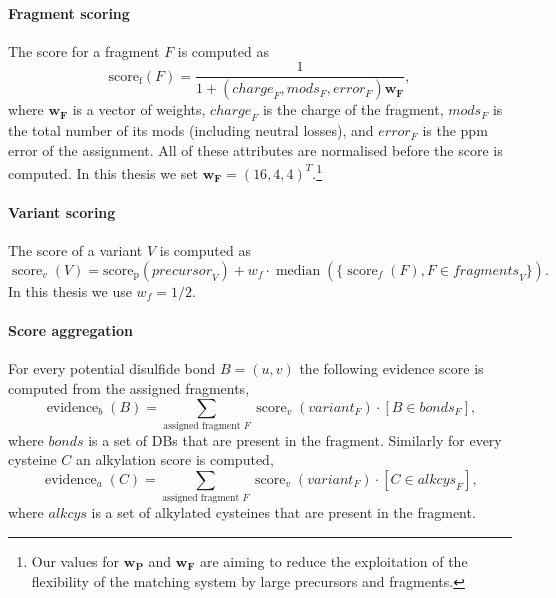 \paragraph{Fragment scoring} The score for a fragment \(F\) is computed as \[\operatorname{score_f}(F) = \frac{1}{1 + (\mathit{charge}_F, \mathit{mods}_F, \mathit{error}_F)\bm{w_F}},\] where \(\bm{w_F}\) is a vector of weights, \(\mathit{charge}_F\) is the charge of the fragment, \(\mathit{mods}_F\) is the total number of its mods (including neutral losses), and \(\mathit{error}_F\) is the ppm error of the assignment. All of these attributes are normalised before the score is computed. In this thesis we set \(\bm{w_F} = (16, 4, 4)^T\).\footnote{Our values for \(\bm{w_P}\) and \(\bm{w_F}\) are aiming to reduce the exploitation of the flexibility of the matching system by large precursors and fragments.}

\paragraph{Variant scoring} The score of a variant \(V\) is computed as \[\operatorname{score}_v(V) = \operatorname{score_p}(\mathit{precursor}_V) + w_f \cdot \operatorname{median}(\{ \operatorname{score}_f(F), F \in \mathit{fragments}_V \}).\] In this thesis we use \(w_f = 1/2\).

\paragraph{Score aggregation} For every potential disulfide bond \(B = (u, v)\) the following evidence score is computed  from the assigned fragments, \[\operatorname{evidence}_b(B) = \sum_{\text{assigned fragment } F} \operatorname{score}_v(\mathit{variant}_F) \cdot [B \in \mathit{bonds}_F], \] where \(\mathit{bonds}\) is a set of DBs that are present in the fragment. Similarly for every cysteine \(C\) an alkylation score is computed, \[\operatorname{evidence}_a(C) = \sum_{\text{assigned fragment } F} \operatorname{score}_v(\mathit{variant}_F) \cdot [C \in \mathit{alkcys}_F],\] where \(\mathit{alkcys}\) is a set of alkylated cysteines that are present in the fragment.

